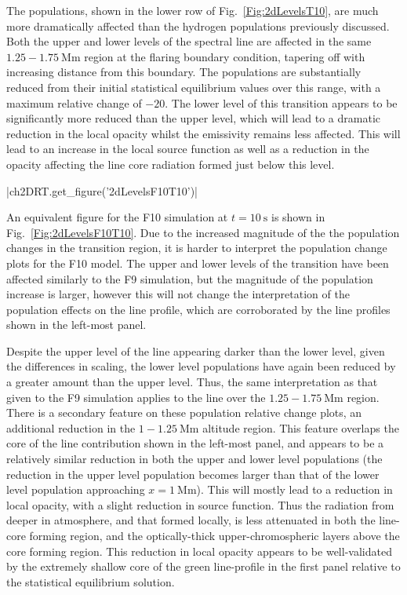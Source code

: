 The \Caii{} populations, shown in the lower row of Fig.~\ref{Fig:2dLevelsT10}, are much more dramatically affected than the hydrogen populations previously discussed.
Both the upper and lower levels of the \CaLine{} spectral line are affected in the same $1.25-\SI{1.75}{\mega\metre}$ region at the flaring boundary condition, tapering off with increasing distance from this boundary.
The populations are substantially reduced from their initial statistical equilibrium values over this range, with a maximum relative change of $-20$.
The lower level of this transition appears to be significantly more reduced than the upper level, which will lead to a dramatic reduction in the local opacity whilst the emissivity remains less affected.
This will lead to an increase in the local source function as well as a reduction in the opacity affecting the line core radiation formed just below this level.

\py[2DRT]|ch2DRT.get_figure('2dLevelsF10T10')|

An equivalent figure for the F10 simulation at $t=\SI{10}{\second}$ is shown in Fig.~\ref{Fig:2dLevelsF10T10}.
Due to the increased magnitude of the the population changes in the transition region, it is harder to interpret the population change plots for the F10 model.
The upper and lower levels of the \Ha{} transition have been affected similarly to the F9 simulation, but the magnitude of the population increase is larger, however this will not change the interpretation of the population effects on the line profile, which are corroborated by the line profiles shown in the left-most panel.

Despite the upper level of the \CaLine{} line appearing darker than the lower level, given the differences in scaling, the lower level populations have again been reduced by a greater amount than the upper level.
Thus, the same interpretation as that given to the F9 simulation applies to the \CaLine{} line over the $1.25-\SI{1.75}{\mega\metre}$ region.
There is a secondary feature on these \Caii{} population relative change plots, an additional reduction in the $1-\SI{1.25}{\mega\metre}$ altitude region.
This feature overlaps the core of the line contribution shown in the left-most panel, and appears to be a relatively similar reduction in both the upper and lower level populations (the reduction in the upper level population becomes larger than that of the lower level population approaching $x=\SI{1}{\mega\metre}$).
This will mostly lead to a reduction in local opacity, with a slight reduction in source function.
Thus the radiation from deeper in atmosphere, and that formed locally, is less attenuated in both the line-core forming region, and the optically-thick upper-chromospheric layers above the core forming region.
This reduction in local opacity appears to be well-validated by the extremely shallow core of the green line-profile in the first panel relative to the statistical equilibrium solution.


